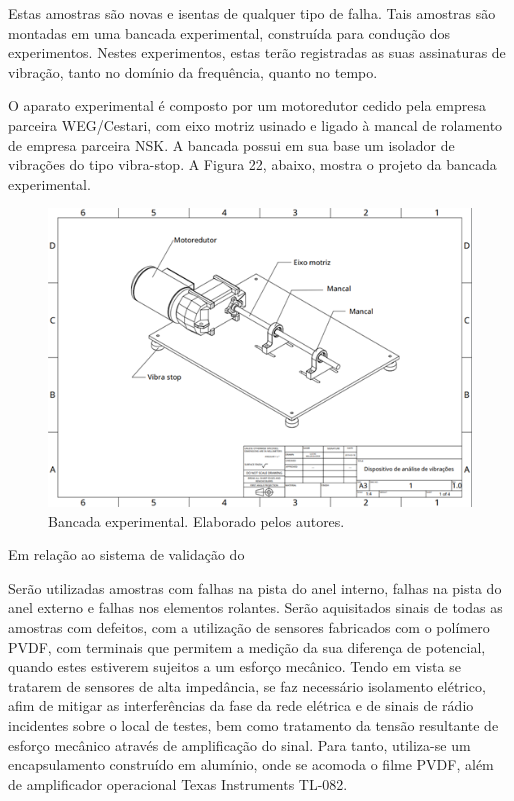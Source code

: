 \documentclass[
	12pt,				
	oneside,			
	a4paper,			
	english,			
	brazil				
	]{abntex2ppgsi}
\begin{document}
Estas amostras são novas e isentas de qualquer tipo de falha. Tais amostras são montadas em uma bancada experimental, construída para condução dos experimentos. Nestes experimentos, estas terão registradas as suas assinaturas de vibração, tanto no domínio da frequência, quanto no tempo. 

O aparato experimental é composto por um motoredutor cedido pela empresa parceira WEG/Cestari, com eixo motriz usinado e ligado à mancal de rolamento de empresa parceira NSK. A bancada possui em sua base um isolador de vibrações do tipo vibra-stop. A Figura 22, abaixo, mostra o projeto da bancada experimental.

\begin{figure}[!htb]
\centering
\includegraphics{Figura22}
\caption {Bancada experimental. Elaborado pelos autores.}
\label{Figura22}
\end{figure} 

Em relação ao sistema de validação do 

Serão utilizadas amostras com falhas na pista do anel interno, falhas na pista do anel externo e falhas nos elementos rolantes. Serão aquisitados sinais de todas as amostras com defeitos, com a utilização de sensores fabricados com o polímero PVDF, com terminais que permitem a medição da sua diferença de potencial, quando estes estiverem sujeitos a um esforço mecânico. Tendo em vista se tratarem de sensores de alta impedância, se faz necessário isolamento elétrico, afim de mitigar as interferências da fase da rede elétrica e de sinais de rádio incidentes sobre o local de testes, bem como tratamento da tensão resultante de esforço mecânico através de amplificação do sinal. Para tanto, utiliza-se um encapsulamento construído em alumínio, onde se acomoda o filme PVDF, além de amplificador operacional Texas Instruments TL-082. 
\end{document}
